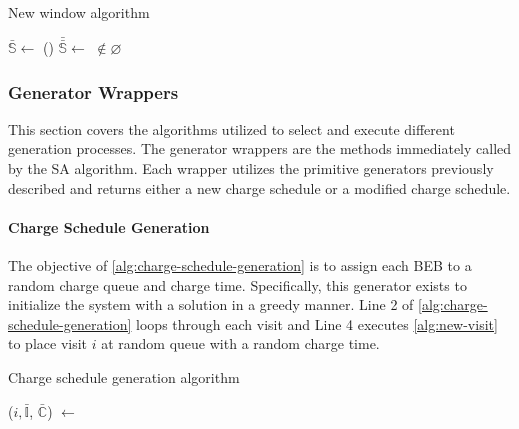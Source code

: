 \documentclass[11pt,a4paper,final]{article}
\newcommand{\I}{\mathbb{I}}                 %
\newcommand{\C}{\mathbb{C}}                 %
\newcommand{\Sol}{\mathbb{S}}               %
\begin{document}
\begin{algorithm}[H]
  \scriptsize
  \caption{New window algorithm} \label{alg:new-window}
  \LinesNumbered
  \KwIn{$\Sol$}
  \KwOut{$\bar{\Sol}$}


  \Begin
  {
    $\bar{\Sol} \leftarrow$\Purge{$\Sol$}
    \If()
       {
         $\bar{\bar{\Sol}} \leftarrow$ \NewVisit{$\bar{\Sol}$} $\not\in \varnothing$
       }
       {
         \Return{$\bar{\bar{\Sol}}$} 
       }

       \Return{($\varnothing$)}
  }
\end{algorithm}

\subsubsection{Generator Wrappers}
\label{sec:generator-wrappers}
This section covers the algorithms utilized to select and execute different generation processes. The generator wrappers
are the methods immediately called by the SA algorithm. Each wrapper utilizes the primitive generators previously
described and returns either a new charge schedule or a modified charge schedule.

\paragraph{Charge Schedule Generation}
\label{sec:charge-schedule-generation}
The objective of \ref{alg:charge-schedule-generation} is to assign each BEB to a random charge queue and charge time.
Specifically, this generator exists to initialize the system with a solution in a greedy manner. Line 2 of
\ref{alg:charge-schedule-generation} loops through each visit and Line 4 executes \ref{alg:new-visit} to place visit \(i\)
at random queue with a random charge time.

\begin{algorithm}[H]
\scriptsize
\caption{Charge schedule generation algorithm} \label{alg:charge-schedule-generation}
    \LinesNumbered
    \KwIn{$\Sol$}
    \KwOut{$\bar{\Sol}$}


    \Begin
    {
        \ForEach {$\I_i \in \I$}
        {
            ($i, \bar{\I}$, $\bar{\C}$) $\leftarrow$ \NewVisit{($\I_i$, $\I$, $\C$)}
        }
            \Return{($0, \bar{\I}$, $\bar{\C}$)}
    }
  \end{algorithm}
\end{document}
